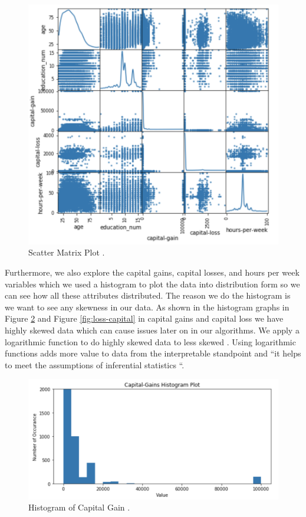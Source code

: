 \documentclass[sigconf]{acmart}
\begin{document}
 \begin{figure}[!ht]
  \centering
      \includegraphics[width=\columnwidth]{images/scatter-matrix.png}
  \caption{Scatter Matrix Plot \cite{Borga2017}.}\label{fig:scatter}
\end{figure}

\par Furthermore, we also explore the capital gains, capital losses, and hours per week variables which we used a histogram to plot the data into distribution form so we can see how all these attributes distributed. The reason we do the histogram is we want to see any skewness in our data. As shown in the histogram graphs in Figure \ref{fig:Hist-capital} and  Figure \ref{fig:loss-capital} in capital gains and capital loss we have highly skewed data which can cause issues later on in our algorithms. We apply a logarithmic function to do highly skewed data to less skewed \cite{www-onlinestat}. Using logarithmic functions adds more value to data from the interpretable standpoint and ``it helps to meet the assumptions of inferential statistics \cite{www-onlinestat}``.

 \begin{figure}[!ht]
  \centering
      \includegraphics[width=\columnwidth]{images/capital-gain.png}
  \caption{Histogram of Capital Gain \cite{Borga2017}.}\label{fig:Hist-capital}
\end{figure}
\end{document}
